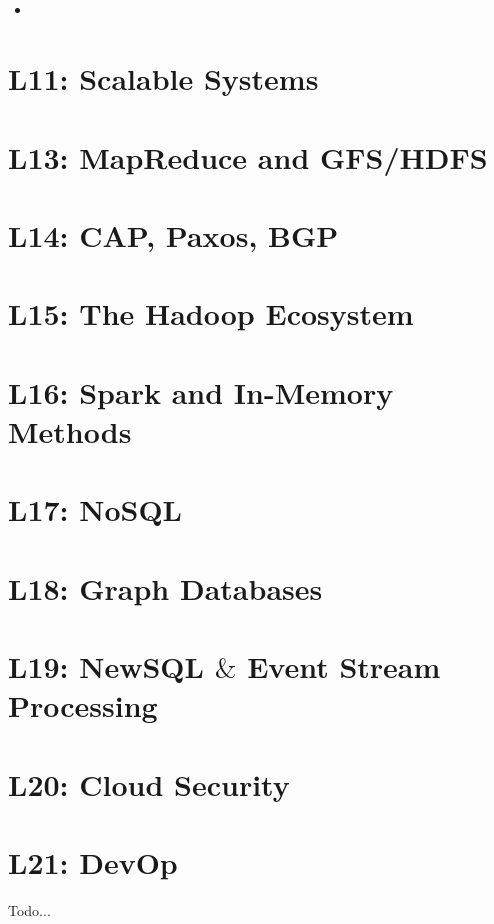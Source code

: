 \documentclass[a4paper]{article}
\begin{document}
\begin{multicols}{3}
\subsection*{}
\begin{itemize}
    \item 
\end{itemize}

\section*{L11: Scalable Systems}

\section*{L13: MapReduce and GFS/HDFS}

\section*{L14: CAP, Paxos, BGP}

\section*{L15: The Hadoop Ecosystem}

\section*{L16: Spark and In-Memory Methods}

\section*{L17: NoSQL}

\section*{L18: Graph Databases}

\section*{L19: NewSQL $\&$ Event Stream Processing}

\section*{L20: Cloud Security}

\section*{L21: DevOp}

Todo...

\vspace*{\fill}
    \pagebreak
\end{multicols}
\end{document}
